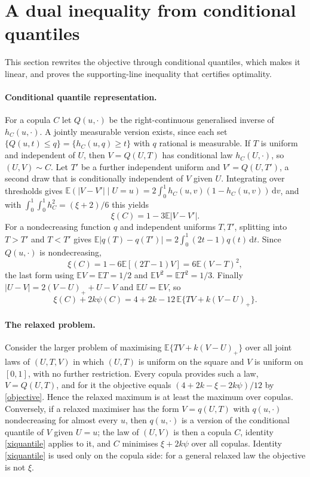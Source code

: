 \documentclass[11pt,a4paper]{article}
\theoremstyle{remark}
\newcommand{\E}{\mathbb E}
\newcommand{\1}{\mathbf 1}
\newcommand{\dd}{\,\mathrm d}
\begin{document}
\section{A dual inequality from conditional quantiles}\label{sec:dual}
This section rewrites the objective through conditional quantiles, which makes it linear, and proves the supporting-line inequality that certifies optimality.

\paragraph{Conditional quantile representation.} For a copula $C$ let $Q(u,\cdot)$ be the right-continuous generalised inverse of $h_C(u,\cdot)$. A jointly measurable version exists, since each set $\{Q(u,t)\le q\}=\{h_C(u,q)\ge t\}$ with $q$ rational is measurable. If $T$ is uniform and independent of $U$, then $V=Q(U,T)$ has conditional law $h_C(U,\cdot)$, so $(U,V)\sim C$. Let $T'$ be a further independent uniform and $V'=Q(U,T')$, a second draw that is conditionally independent of $V$ given $U$. Integrating over thresholds gives $\E(|V-V'|\mid U=u)=2\int_0^1 h_C(u,v)(1-h_C(u,v))\dd v$, and with $\int_0^1\!\int_0^1 h_C^2=(\xi+2)/6$ this yields
\[
 \xi(C)=1-3\E|V-V'|.
\]
For a nondecreasing function $q$ and independent uniforms $T,T'$, splitting into $T>T'$ and $T<T'$ gives $\E|q(T)-q(T')|=2\int_0^1(2t-1)q(t)\dd t$. Since $Q(u,\cdot)$ is nondecreasing,
\begin{equation}
 \xi(C)=1-6\E[(2T-1)V]=6\E(V-T)^2,\label{xiquantile}
\end{equation}
the last form using $\E V=\E T=1/2$ and $\E V^2=\E T^2=1/3$. Finally $|U-V|=2(V-U)_++U-V$ and $\E U=\E V$, so
\begin{equation}
 \xi(C)+2k\psi(C)=4+2k-12\,\E\{TV+k(V-U)_+\}. \label{objective}
\end{equation}

\paragraph{The relaxed problem.} Consider the larger problem of maximising $\E\{TV+k(V-U)_+\}$ over all joint laws of $(U,T,V)$ in which $(U,T)$ is uniform on the square and $V$ is uniform on $[0,1]$, with no further restriction. Every copula provides such a law, $V=Q(U,T)$, and for it the objective equals $(4+2k-\xi-2k\psi)/12$ by \eqref{objective}. Hence the relaxed maximum is at least the maximum over copulas. Conversely, if a relaxed maximiser has the form $V=q(U,T)$ with $q(u,\cdot)$ nondecreasing for almost every $u$, then $q(u,\cdot)$ is a version of the conditional quantile of $V$ given $U=u$; the law of $(U,V)$ is then a copula $C$, identity \eqref{xiquantile} applies to it, and $C$ minimises $\xi+2k\psi$ over all copulas. Identity \eqref{xiquantile} is used only on the copula side: for a general relaxed law the objective is not $\xi$.
\end{document}
